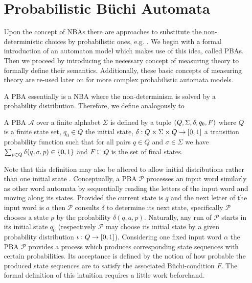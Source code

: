 \section{Probabilistic Büchi Automata}
Upon the concept of \acp{NBA} there are approaches to substitute the
non-deterministic choices by probabilistic ones, e.g.
\cite{RecOmeLangProbAuto,DecProblemsForProbAuto,Groesser}. We begin with
a formal introduction of an automaton model which makes use of this idea,
called \aclp{PBA}. Then we proceed by introducing the necessary concept of
measuring theory to formally define their semantics. Additionally, these basic
concepts of measuring theory are re-used later on for more complex
probabilistic automata models.

A \ac{PBA} essentially is a \ac{NBA} where the non-determinism is solved by a 
probability distribution. Therefore, we define analogously to 
\cite{Groesser}
\begin{definition}
  A \acl{PBA} $\mathcal{A}$ over a finite alphabet $\Sigma$ is defined by a
  tuple $\left(Q, \Sigma, \delta, q_{0}, F\right)$ where $Q$ is a finite state set,
  $q_{0}\in Q$ the initial state,
    $\delta:Q\times\Sigma\times Q\rightarrow \left[0,1\right]$
  a transition probability function such that for all pairs $q\in Q$ and
  $\sigma\in\Sigma$ we have $\sum_{p\in Q}\delta(q,\sigma,p)\in\left\{0,1\right\}$
  and $F\subseteq Q$ is the set of final states.
\end{definition}
Note that this definition may also be altered to allow initial distributions
rather than one initial state \cite{RecOmeLangProbAuto}. Conceptually, a
\ac{PBA} $\mathcal{P}$ processes an input word similarly as other word automata
by sequentially reading the letters of the input word and moving along its
states. Provided the current state is $q$ and the next letter of the input word 
is $a$ then $\mathcal{P}$ consults $\delta$ to determine its next state,
specifically $\mathcal{P}$ chooses a state $p$ by the probability
$\delta(q,a,p)$. Naturally, any run of $\mathcal{P}$ starts in its initial
state $q_{0}$ (respectively $\mathcal{P}$ may choose its initial state by a
given probability distribution $\iota:Q\rightarrow\left[0,1\right]$). Considering
one fixed input word $\alpha$ the \ac{PBA} $\mathcal{P}$ provides a process
which produces corresponding state sequences with certain probabilities. Its
acceptance is defined by the notion of how probable the produced state 
sequences are to satisfy the associated Büchi-condition $F$. The formal
definition of this intuition requires a little work beforehand.
